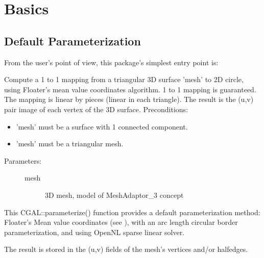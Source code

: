\section{Basics}


\subsection{Default Parameterization}

From the user's point of view, this package's simplest entry point is:

{
Compute a 1 to 1 mapping from a triangular 3D surface 'mesh' to 2D circle, using
Floater's mean value coordinates algorithm. 1 to 1 mapping is guaranteed.
The mapping is linear by pieces (linear in each triangle). The result is the (u,v) pair image of each vertex of the 3D surface.
Preconditions:\begin{itemize}
\item 'mesh' must be a surface with 1 connected component.\item 'mesh' must be a triangular mesh.\end{itemize}
}
\begin{description}
\item[Parameters: ]
\begin{description}
\item[mesh]3D mesh, model of MeshAdaptor\_3 concept \end{description}
\end{description}

This CGAL::parameterize() function provides a default parameterization method: Floater's
Mean value coordinates (see \cite{cgal:f-mvc-03}), with an arc length circular border
parameterization, and using OpenNL sparse linear solver.

The result is stored in the (u,v) fields of the mesh's vertices and/or halfedges.

